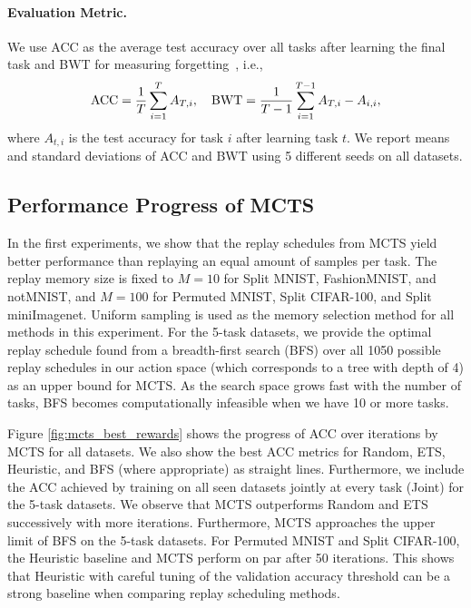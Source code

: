 \paragraph{Evaluation Metric.} 
We use ACC as the average test accuracy over all tasks after learning the final task and BWT for measuring forgetting~, i.e.,
\begin{align}
	\textnormal{ACC} = \frac{1}{T} \sum_{i=1}^{T} A_{T, i}, \quad \textnormal{BWT} = \frac{1}{T-1} \sum_{i=1}^{T-1} A_{T, i} - A_{i, i},
\end{align}
where $A_{t, i}$ is the test accuracy for task $i$ after learning task $t$. We report means and standard deviations of ACC and BWT using 5 different seeds on all datasets. 



%
\subsection{Performance Progress of MCTS}\label{paperC:sec:results_with_mcts}

In the first experiments, we show that the replay schedules from MCTS yield better performance than replaying an equal amount of samples per task. 
The replay memory size is fixed to $M=10$ for Split MNIST, FashionMNIST, and notMNIST, and $M=100$ for Permuted MNIST, Split CIFAR-100, and Split miniImagenet. Uniform sampling is used as the memory selection method for all methods in this experiment.
For the 5-task datasets, we provide the optimal replay schedule found from a breadth-first search (BFS) over all 1050 possible replay schedules in our action space (which corresponds to a tree with depth of 4) as an upper bound for MCTS. As the search space grows fast with the number of tasks, BFS becomes computationally infeasible when we have 10 or more tasks.


Figure \ref{fig:mcts_best_rewards} shows the progress of ACC over %
iterations by MCTS for all datasets. We also show the best ACC metrics for Random, ETS, Heuristic, and BFS (where appropriate) as straight lines. 
Furthermore, we include the ACC achieved by training on all seen datasets jointly at every task (Joint) for the 5-task datasets.
We observe that MCTS outperforms Random and ETS successively with more iterations. Furthermore, MCTS approaches the upper limit of BFS on the 5-task datasets. For Permuted MNIST and Split CIFAR-100, the Heuristic baseline and MCTS perform on par after 50 iterations. This shows that Heuristic with careful tuning of the validation accuracy threshold can be a strong baseline when comparing replay scheduling methods. %


